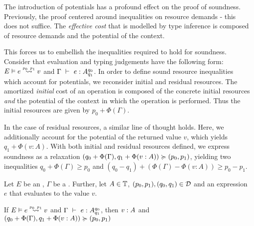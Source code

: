 The introduction of potentials has a profound effect on the proof of soundness. Previously, the proof centered around inequalities on resource demands - this does not suffice. The \emph{effective cost} that is modelled by type inference is composed of resource demands and the potential of the context. 

This forces us to embellish the inequalities required to hold for soundness. Consider that evaluation and typing judgements have the following form:  \(\evals{E}{e}{v}{p_0}{p_1}\) and \(\Gamma~\vdash~e:A ^{q_0}_{q_1}\). In order to define sound resource inequalities which account for potentials, we reconsider initial and residual resources. The amortized \emph{initial} cost of an operation is composed of the concrete initial resources \emph{and} the potential of the context in which the operation is performed. Thus the initial resources are given by \(p_0 + \Phi(\Gamma)\). 

In the case of residual resources, a similar line of thought holds. Here, we additionally account for the potential of the returned value \(v\), which yields \(q_1 + \Phi(v : A)\). With both initial and residual resources defined, we express soundness as a relaxation \((q_0 + \Phi(\Gamma), q_1 + \Phi(v : A)) \succcurlyeq (p_0, p_1)\), yielding two inequalities \(q_0 + \Phi(\Gamma) \geq p_0\) and \((q_0 - q_1) + (\Phi(\Gamma) - \Phi(v : A)) \geq p_0 - p_1\).



\begin{theorem}\label{thm:soundness-7}
   Let \(E\) be an , \(\Gamma\) be a . Further, let \(A \in \mathbb{T}\), \((p_0, p_1), (q_0, q_1) \in \mathcal{D}\) and an expression \(e\) that evaluates to the value \(v\). 

   \begin{center}
   If \(\evals{E}{e}{v}{p_0}{p_1}\) and \(\Gamma~\vdash~e:A ^{q_0}_{q_1}\), then \(v : A ^{}_{}\) and \((q_0 + \Phi(\Gamma), q_1 + \Phi(v : A)) \succcurlyeq (p_0, p_1)\)
   \end{center}
\end{theorem}

